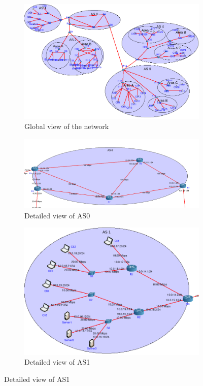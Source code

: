     \begin{figure}
    \centering
    \begin{subfigure}[t]{\textwidth}
    \centering
    \includegraphics[scale=0.7]{img/topology-experiments-global.png}
    \caption{Global view of the network}    
    \label{fig:exp-global}
    \end{subfigure}

    \begin{subfigure}[t]{\textwidth}
    \centering
    \includegraphics[scale=0.5]{img/topology-experiments-AS0.png}
    \caption{Detailed view of AS0}    
    \label{fig:exp-as0}
    \end{subfigure}

    \begin{subfigure}[t]{\textwidth}
    \centering
    \includegraphics[scale=0.5]{img/topology-experiments-AS1.png}
    \caption{Detailed view of AS1}    
    \label{fig:exp-as1}
    \end{subfigure}
    \end{figure}


